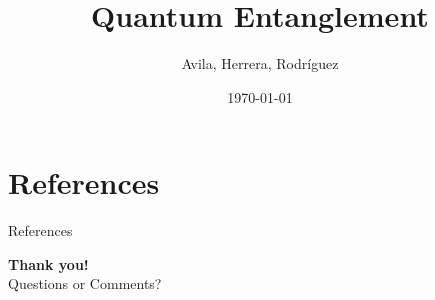 \documentclass[aspectratio=169,sn-mathphys-num]{beamer}
\title{Quantum Entanglement}
\subtitle{}
\author{Avila, Herrera, Rodríguez}
\institute{Universidad Distrital Francisco José de Caldas}
\date{\today}
\begin{document}
\begin{frame}
	\titlepage
\end{frame}











\section{References}
\begin{frame}[allowframebreaks]{References}
	\printbibliography
	\nocite{*}
\end{frame}

\begin{frame}[plain]
	\centering
	\vspace{1cm}
	{\Huge \textbf{Thank you!}}\\[1cm]
	{\large Questions or Comments?}
\end{frame}

\begin{frame}
	\titlepage
\end{frame}
\end{document}
